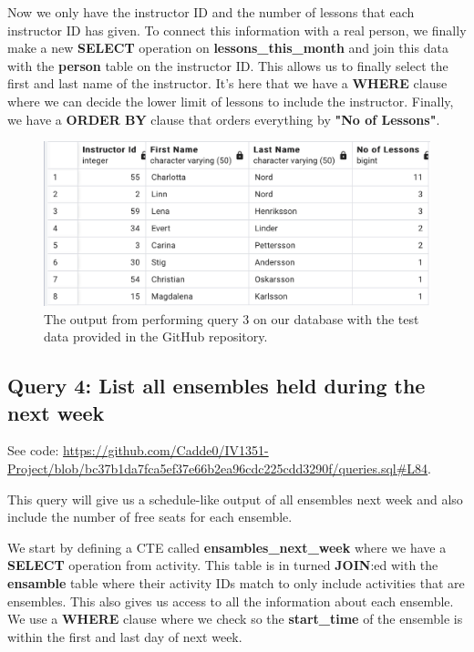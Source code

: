 \documentclass[a4paper]{scrartcl}
\begin{document}
Now we only have the instructor ID and the number of lessons that each instructor ID has given. To connect this information with a real person, we finally make a new \textbf{SELECT} operation on \textbf{lessons\_this\_month} and join this data with the \textbf{person} table on the instructor ID. This allows us to finally select the first and last name of the instructor. It's here that we have a \textbf{WHERE} clause where we can decide the lower limit of lessons to include the instructor. Finally, we have a \textbf{ORDER BY} clause that orders everything by \textbf{"No of Lessons"}.

\begin{figure}[H]
    \begin{center}
      \includegraphics[scale=0.6]{query3_output.png}
      \caption{The output from performing query 3 on our database with the test data provided in the GitHub repository.}
      \label{fig:diag}
    \end{center}
  \end{figure}

\subsection{Query 4: List all ensembles held during the next week}
See code: \url{https://github.com/Cadde0/IV1351-Project/blob/bc37b1da7fca5ef37e66b2ea96cdc225cdd3290f/queries.sql#L84}.

This query will give us a schedule-like output of all ensembles next week and also include the number of free seats for each ensemble.

We start by defining a CTE called \textbf{ensambles\_next\_week} where we have a \textbf{SELECT} operation from activity. This table is in turned \textbf{JOIN}:ed with the \textbf{ensamble} table where their activity IDs match to only include activities that are ensembles. This also gives us access to all the information about each ensemble. We use a \textbf{WHERE} clause where we check so the \textbf{start\_time} of the ensemble is within the first and last day of next week.
\end{document}
